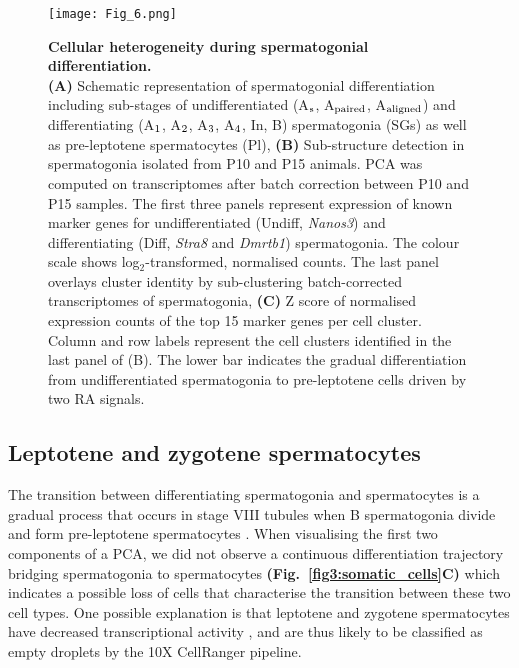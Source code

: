 \begin{figure}[!h]
\centering
\texttt{[image: Fig\_6.png]}
\caption[Cellular heterogeneity during spermatogonial differentiation]{\textbf{Cellular heterogeneity during spermatogonial differentiation.}\\
\textbf{(A)} Schematic representation of spermatogonial differentiation including sub-stages of undifferentiated (A$_\textnormal{s}$, A$_\textnormal{paired}$, A$_\textnormal{aligned}$) and differentiating (A$_\textnormal{1}$, A$_\textnormal{2}$, A$_\textnormal{3}$, A$_\textnormal{4}$, In, B) spermatogonia (SGs) as well as pre-leptotene spermatocytes (Pl), \textbf{(B)} Sub-structure detection in spermatogonia isolated from P10 and P15 animals. PCA was computed on transcriptomes after batch correction between P10 and P15 samples. The first three panels represent expression of known marker genes for undifferentiated (Undiff, \textit{Nanos3}) and differentiating (Diff, \textit{Stra8} and \textit{Dmrtb1}) spermatogonia. The colour scale shows log$_2$-transformed, normalised counts. The last panel overlays cluster identity by sub-clustering batch-corrected transcriptomes of spermatogonia, \textbf{(C)} Z score of normalised expression counts of the top 15 marker genes per cell cluster. Column and row labels represent the cell clusters identified in the last panel of (B). The lower bar indicates the gradual differentiation from undifferentiated spermatogonia to pre-leptotene cells driven by two \gls{RA} signals. }
\label{fig3:spermatogonia}
\end{figure}

\newpage

\subsection{Leptotene and zygotene spermatocytes}

The transition between differentiating spermatogonia and spermatocytes is a gradual process that occurs in stage VIII tubules when B spermatogonia divide and form pre-leptotene spermatocytes \citep{Anderson2008, Baltus2006}. When visualising the first two components of a PCA, we did not observe a continuous differentiation trajectory bridging spermatogonia to spermatocytes \textbf{(Fig.~\ref{fig3:somatic_cells}C)} which indicates a possible loss of cells that characterise the transition between these two cell types. One possible explanation is that leptotene and zygotene spermatocytes have decreased transcriptional activity \citep{Kierszenbaum1974, Monesi1965}, and are thus likely to be classified as empty droplets by the 10X CellRanger pipeline. \\

